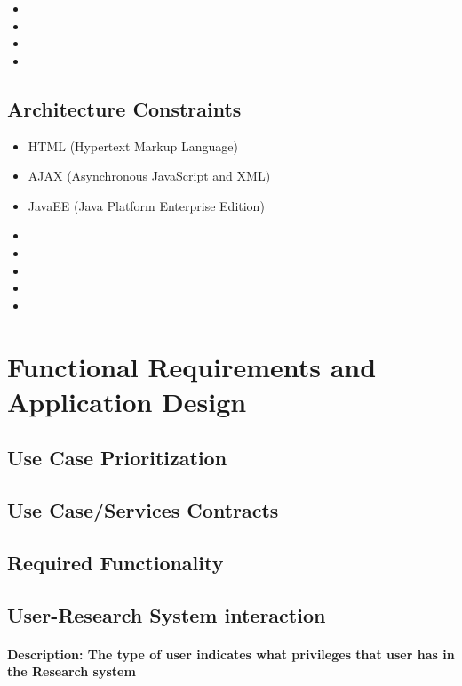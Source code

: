 \documentclass[a4paper]{article}
\begin{document}
\begin{itemize}
	\item 
	\item 
	\item 
	\item 
\end{itemize}

\subsection{Architecture Constraints}

\begin{itemize}
	\item HTML (Hypertext Markup Language)
	\item AJAX (Asynchronous JavaScript and XML)
	\item JavaEE (Java Platform Enterprise Edition)
	\item 
	\item 
	\item 
	\item 
	\item 
	
\end{itemize}

\section{Functional Requirements and Application Design}

\subsection{Use Case Prioritization}

\subsection{Use Case/Services Contracts}

\subsection{Required Functionality}
\subsection{User-Research System interaction}
\paragraph{\textbf{Description:} The type of user indicates what privileges that user has in the Research system}
\end{document}
